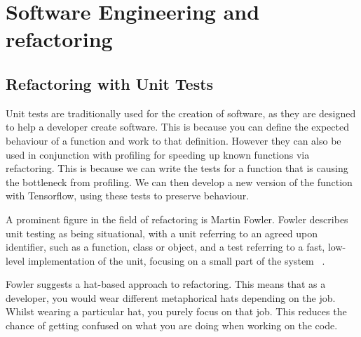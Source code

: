 \section{Software Engineering and refactoring}



\subsection{Refactoring with Unit Tests}

Unit tests are traditionally used for the creation of software, as they are designed to help a developer create software.
This is because you can define the expected behaviour of a function and work to that definition.
However they can also be used in conjunction with profiling for speeding up known functions via refactoring.
This is because we can write the tests for a function that is causing the bottleneck from profiling.
We can then develop a new version of the function with Tensorflow, using these tests to preserve behaviour.






A prominent figure in the field of refactoring is Martin Fowler.
Fowler describes unit testing as being situational, with a unit referring to an agreed upon identifier, such as a function, class or object, and a test referring to a fast, low-level implementation of the unit, focusing on a small part of the system ~\citep{fowlerUnit2014}.

Fowler suggests a hat-based approach to refactoring.
This means that as a developer, you would wear different metaphorical hats depending on the job.
Whilst wearing a particular hat, you purely focus on that job.
This reduces the chance of getting confused on what you are doing when working on the code.

